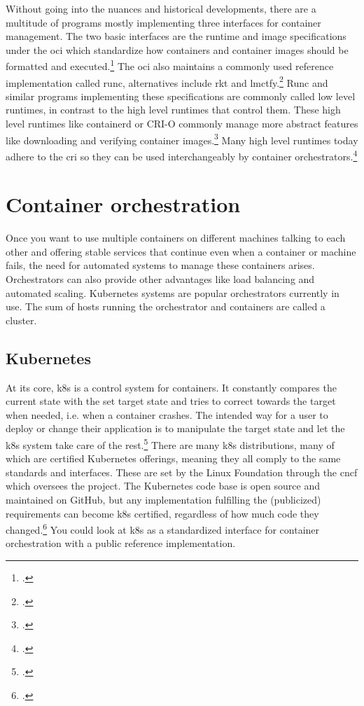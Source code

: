 Without going into the nuances and historical developments, there are a multitude of programs mostly implementing three interfaces for container management.
The two basic interfaces are the runtime and image specifications under the \gls{oci} which standardize how containers and container images should be formatted and executed.\footcite[][, first paragraph]{ociStandards}
The \gls{oci} also maintains a commonly used reference implementation called runc, alternatives include rkt and lmctfy.\footcite[][, section 'Examples of Low-Level Container Runtimes']{lowLevelRuntimes}
Runc and similar programs implementing these specifications are commonly called low level runtimes, in contrast to the high level runtimes that control them.
These high level runtimes like containerd or CRI-O commonly manage more abstract features like downloading and verifying container images.\footcite[][, Intro and section 'Examples of High-Level Runtimes']{highLevelRuntimes}
Many high level runtimes today adhere to the \gls{cri} so they can be used interchangeably by container orchestrators.\footcite[][, section 'Purpose']{criGithub}


\section{Container orchestration}
Once you want to use multiple containers on different machines talking to each other and offering stable services that continue even when a container or machine fails, the need for automated systems to manage these containers arises. Orchestrators can also provide other advantages like load balancing and automated scaling.
Kubernetes systems are popular orchestrators currently in use.
The sum of hosts running the orchestrator and containers are called a cluster.

\subsection{Kubernetes}
At its core, \gls{k8s} is a control system for containers.
It constantly compares the current state with the set target state and tries to correct towards the target when needed, i.e. when a container crashes.
The intended way for a user to deploy or change their application is to manipulate the target state and let the \gls{k8s} system take care of the rest.\footcite[][, section 'Understanding Kubernetes Objects']{k8sObjects}
There are many \gls{k8s} distributions, many of which are certified Kubernetes offerings, meaning they all comply to the same standards and interfaces. These are set by the Linux Foundation through the \gls{cncf} which oversees the project.
The Kubernetes code base is open source and maintained on GitHub, but any implementation fulfilling the (publicized) requirements can become \gls{k8s} certified, regardless of how much code they changed.\footcite[][, section 'There are over 80 Certified Kubernetes offerings.']{certifiedK8s} You could look at \gls{k8s} as a standardized interface for container orchestration with a public reference implementation.

